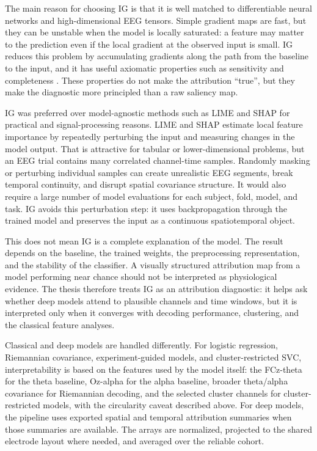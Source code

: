 \documentclass[11pt,a4paper,chapterprefix=false,parskip=false]{scrreprt}
\begin{document}
The main reason for choosing IG is that it is well matched to differentiable neural networks and high-dimensional EEG tensors. Simple gradient maps are fast, but they can be unstable when the model is locally saturated: a feature may matter to the prediction even if the local gradient at the observed input is small. IG reduces this problem by accumulating gradients along the path from the baseline to the input, and it has useful axiomatic properties such as sensitivity and completeness \citep{sundararajan_axiomatic_2017}. These properties do not make the attribution ``true'', but they make the diagnostic more principled than a raw saliency map.

IG was preferred over model-agnostic methods such as LIME \citep{ribeiro_why_2016} and SHAP \citep{lundberg_unified_2017} for practical and signal-processing reasons. LIME and SHAP estimate local feature importance by repeatedly perturbing the input and measuring changes in the model output. That is attractive for tabular or lower-dimensional problems, but an EEG trial contains many correlated channel-time samples. Randomly masking or perturbing individual samples can create unrealistic EEG segments, break temporal continuity, and disrupt spatial covariance structure. It would also require a large number of model evaluations for each subject, fold, model, and task. IG avoids this perturbation step: it uses backpropagation through the trained model and preserves the input as a continuous spatiotemporal object.

This does not mean IG is a complete explanation of the model. The result depends on the baseline, the trained weights, the preprocessing representation, and the stability of the classifier. A visually structured attribution map from a model performing near chance should not be interpreted as physiological evidence. The thesis therefore treats IG as an attribution diagnostic: it helps ask whether deep models attend to plausible channels and time windows, but it is interpreted only when it converges with decoding performance, clustering, and the classical feature analyses.


Classical and deep models are handled differently. For logistic regression, Riemannian covariance, experiment-guided models, and cluster-restricted SVC, interpretability is based on the features used by the model itself: the FCz-theta for the theta baseline, Oz-alpha for the alpha baseline, broader theta/alpha covariance for Riemannian decoding, and the selected cluster channels for cluster-restricted models, with the circularity caveat described above. For deep models, the pipeline uses exported spatial and temporal attribution summaries when those summaries are available. The arrays are normalized, projected to the shared electrode layout where needed, and averaged over the reliable cohort.
\end{document}
